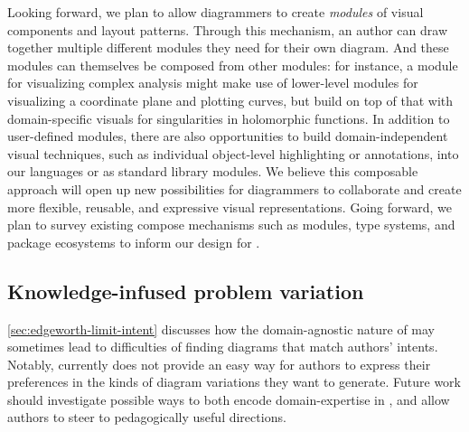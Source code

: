 Looking forward, we plan to allow diagrammers to create \emph{modules} of visual components and layout patterns. Through this mechanism, an author can draw together multiple different modules they need for their own diagram. And these modules can themselves be composed from other modules: for instance, a module for visualizing complex analysis might make use of lower-level modules for visualizing a coordinate plane and plotting curves, but build on top of that with domain-specific visuals for singularities in holomorphic functions. In addition to user-defined modules, there are also opportunities to build domain-independent visual techniques, such as individual object-level highlighting or annotations, into our languages or as standard library modules. We believe this composable approach will open up new possibilities for diagrammers to collaborate and create more flexible, reusable, and expressive visual representations. Going forward, we plan to survey existing compose mechanisms such as modules, type systems, and package ecosystems to inform our design for \Penrose.


\subsection{Knowledge-infused problem variation}
\label{sec:knowledge}




\cref{sec:edgeworth-limit-intent} discusses how the domain-agnostic nature of \Edgeworth may sometimes lead to difficulties of finding diagrams that match authors' intents. Notably, \Edgeworth currently does not provide an easy way for authors to express their preferences in the kinds of diagram variations they want to generate. Future work should investigate possible ways to both encode domain-expertise in \Edgeworth, and allow authors to steer \Edgeworth to pedagogically useful directions.

